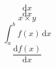 \documentclass{article}
\newcommand{\diff}[1]{\mathrm{d}#1}
\newcommand{\test}[2]{#1 \times #2}
\newcommand{\integral}[4]{\int_{#1}^{#2} #3 \, \diff{#4}}
\newcommand{\derivative}[2]{\frac{\diff{#1}(#2)}{\diff{#2}}}
\begin{document}
  \[
    \mathrm{d}x
  \]
  \[
    \diff{x}
  \]
  \[
    \test{x}{y}
  \]
  \[
    \integral{a}{b}{f(x)}{x}
  \]
  \[
    \derivative{f}{x}
  \]
\end{document}
